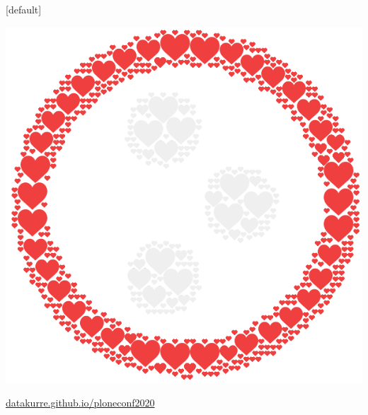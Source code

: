 \documentclass[12pt,aspectratio=169]{beamer}
\begin{document}
[default]
\begin{frame}[standout]
\vfill
\includegraphics[height=0.50\paperheight]{images/plone-icon-hearts.png}
\par
\href{https://datakurre.github.io/ploneconf2020/}{datakurre.github.io/ploneconf2020}
\end{frame}

\end{document}
